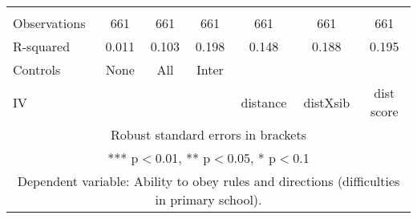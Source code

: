 \begin{tabular}{lcccccc}
 &  &  &  &  &  &  \\
Observations & 661 & 661 & 661 & 661 & 661 & 661 \\
R-squared & 0.011 & 0.103 & 0.198 & 0.148 & 0.188 & 0.195 \\
Controls & None & All & Inter &  &  &  \\
 IV &  &  &  & distance & distXsib & dist score \\ \hline
\multicolumn{7}{c}{ Robust standard errors in brackets} \\
\multicolumn{7}{c}{ *** p$<$0.01, ** p$<$0.05, * p$<$0.1} \\
\multicolumn{7}{c}{ Dependent variable: Ability to obey rules and directions (difficulties in primary school).} \\
\end{tabular}
